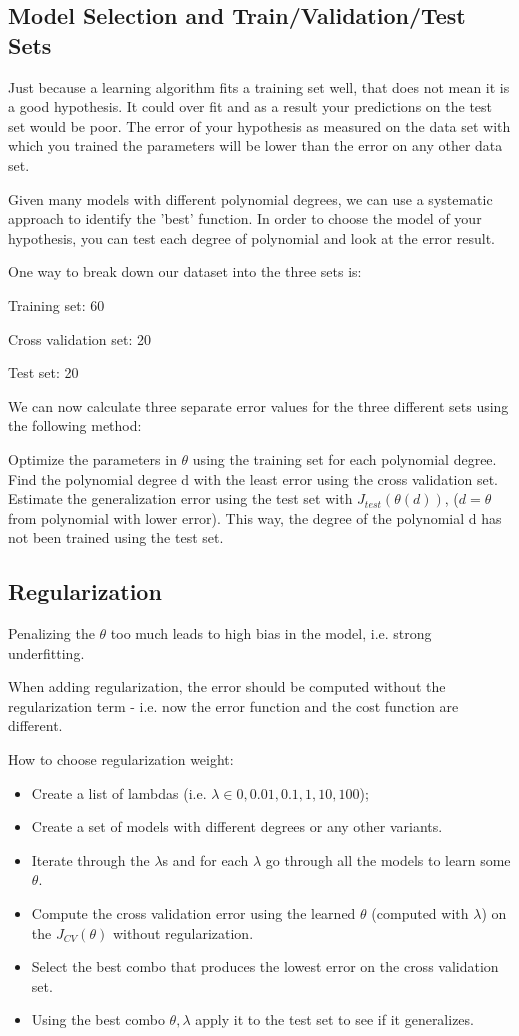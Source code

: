 \subsection{Model Selection and Train/Validation/Test Sets}
Just because a learning algorithm fits a training set well, that does not mean it is a good hypothesis. It could over fit and as a result your predictions on the test set would be poor. The error of your hypothesis as measured on the data set with which you trained the parameters will be lower than the error on any other data set.

Given many models with different polynomial degrees, we can use a systematic approach to identify the 'best' function. In order to choose the model of your hypothesis, you can test each degree of polynomial and look at the error result.

One way to break down our dataset into the three sets is:

Training set: 60

Cross validation set: 20

Test set: 20

We can now calculate three separate error values for the three different sets using the following method:

Optimize the parameters in $\theta$ using the training set for each polynomial degree.
Find the polynomial degree d with the least error using the cross validation set.
Estimate the generalization error using the test set with $J_{test}(\theta(d))$, ($d = \theta$ from polynomial with lower error). 
This way, the degree of the polynomial d has not been trained using the test set.

\subsection{Regularization}

Penalizing the $\theta$ too much leads to high bias in the model, i.e. strong underfitting. 

When adding regularization, the error should be computed without the regularization term - i.e. now the error function and the cost function are different.


How to choose regularization weight:
\begin{itemize}
\item Create a list of lambdas (i.e. $\lambda \in {0,0.01,0.1, 1, 10, 100}$);
\item Create a set of models with different degrees or any other variants.
\item Iterate through the $\lambda$s and for each $\lambda$ go through all the models to learn some $\theta$.
\item Compute the cross validation error using the learned $\theta$ (computed with $\lambda$) on the $J_{CV}(\theta)$ without regularization.
\item Select the best combo that produces the lowest error on the cross validation set.
\item Using the best combo $\theta,\lambda$ apply it to the test set to see if it generalizes.
\end{itemize}

